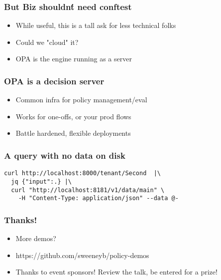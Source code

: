 \documentclass{beamer}
\begin{document}
\begin{frame}
\frametitle{But Biz shouldn\'t need conftest}
\begin{itemize}
  \item While useful, this is a tall ask for less technical folks
  \item Could we "cloud" it?
  \item OPA is the engine running as a server
\end{itemize}
\end{frame}

\begin{frame}
\frametitle{OPA is a decision server\footnotemark}
\begin{itemize}
  \item Common infra for policy management/eval 
  \item Works for one-offs, or your prod flows
  \item Battle hardened, flexible deployments
\end{itemize}
\end{frame}

\begin{frame}[fragile]
\frametitle{A query with no data on disk}
\begin{verbatim}
curl http://localhost:8000/tenant/Second  |\
  jq {"input":.} |\
  curl "http://localhost:8181/v1/data/main" \
    -H "Content-Type: application/json" --data @-
\end{verbatim}
\end{frame}

\begin{frame}
\frametitle{Thanks!}
\begin{itemize}
  \item More demos? 
  \item https://github.com/sweeneyb/policy-demos
  \item Thanks to event sponsors! Review the talk, be entered for a prize!
\end{itemize}
\end{frame}
\end{document}
